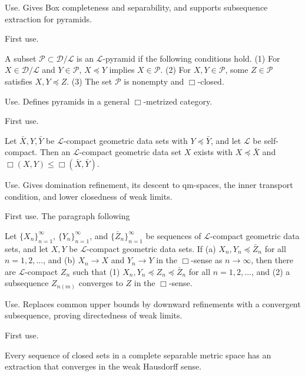 \documentclass{amsart}
\theoremstyle{plain}
\theoremstyle{definition}
\theoremstyle{remark}
\newcommand{\D}{\mathcal{D}}
\renewcommand{\L}{\mathcal{L}}
\begin{document}
\begin{description}
\textup{Use.} Gives Box completeness and separability, and supports subsequence extraction for pyramids.

\textup{First use.} 

\item[\cite{gds2}, Definition~5.1]
A subset $\mathcal P\subset\D/\L$ is an $\L$-pyramid if the following conditions hold. \textup{(1)} For $X\in\D/\L$ and $Y\in\mathcal P$, $X\preceq Y$ implies $X\in\mathcal P$. \textup{(2)} For $X,Y\in\mathcal P$, some $Z\in\mathcal P$ satisfies $X,Y\preceq Z$. \textup{(3)} The set $\mathcal P$ is nonempty and $\Box$-closed.

\textup{Use.} Defines pyramids in a general $\Box$-metrized category.

\textup{First use.} 

\item[\cite{gds2}, Lemma~5.4]
Let $\bar X,Y,\bar Y$ be $\L$-compact geometric data sets with $Y\preceq\bar Y$, and let $\L$ be self-compact. Then an $\L$-compact geometric data set $X$ exists with $X\preceq\bar X$ and $\Box(X,Y)\leq\Box(\bar X,\bar Y)$.

\textup{Use.} Gives domination refinement, its descent to qm-spaces, the inner transport condition, and lower closedness of weak limits.

\textup{First use.} The paragraph following 

\item[\cite{gds2}, Lemma~5.6]
Let $\{X_n\}_{n=1}^\infty$, $\{Y_n\}_{n=1}^\infty$, and $\{\bar Z_n\}_{n=1}^\infty$ be sequences of $\L$-compact geometric data sets, and let $X,Y$ be $\L$-compact geometric data sets. If \textup{(a)} $X_n,Y_n\preceq\bar Z_n$ for all $n=1,2,\ldots$, and \textup{(b)} $X_n\to X$ and $Y_n\to Y$ in the $\Box$-sense as $n\to\infty$, then there are $\L$-compact $Z_n$ such that \textup{(1)} $X_n,Y_n\preceq Z_n\preceq\bar Z_n$ for all $n=1,2,\ldots$, and \textup{(2)} a subsequence $Z_{n(m)}$ converges to $Z$ in the $\Box$-sense.

\textup{Use.} Replaces common upper bounds by downward refinements with a convergent subsequence, proving directedness of weak limits.

\textup{First use.} 

\item[\cite{gds2}, Lemma~2.11]
Every sequence of closed sets in a complete separable metric space has an extraction that converges in the weak Hausdorff sense.


\end{description}
\end{document}
